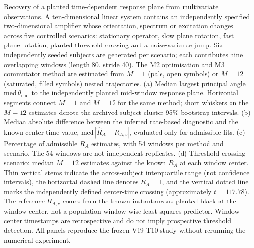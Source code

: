 \caption{Recovery of a planted time-dependent response plane from multivariate observations. A ten-dimensional linear system contains an independently specified two-dimensional amplifier whose orientation, spectrum or excitation changes across five controlled scenarios: stationary operator, slow plane rotation, fast plane rotation, planted threshold crossing and a noise-variance jump. Six independently seeded subjects are generated per scenario; each contributes nine overlapping windows (length 80, stride 40). The M2 optimisation and M3 commutator method are estimated from $M=1$ (pale, open symbols) or $M=12$ (saturated, filled symbols) nested trajectories. (a) Median largest principal angle $\mathrm{med}\,\theta_{\mathrm{mid}}$ to the independently planted mid-window response plane. Horizontal segments connect $M=1$ and $M=12$ for the same method; short whiskers on the $M=12$ estimates denote the archived subject-cluster 95\% bootstrap intervals. (b) Median absolute difference between the inferred rate-based diagnostic and the known center-time value, $\mathrm{med}\,|\widehat R_A-R_{A,c}|$, evaluated only for admissible fits. (c) Percentage of admissible $R_A$ estimates, with 54 windows per method and scenario. The 54 windows are not independent replicates. (d) Threshold-crossing scenario: median $M=12$ estimates against the known $R_A$ at each window center. Thin vertical stems indicate the across-subject interquartile range (not confidence intervals), the horizontal dashed line denotes $R_A=1$, and the vertical dotted line marks the independently defined center-time crossing (approximately $t=117.78$). The reference $R_{A,c}$ comes from the known instantaneous planted block at the window center, not a population window-wise least-squares predictor. Window-center timestamps are retrospective and do not imply prospective threshold detection. All panels reproduce the frozen V19 T10 study without rerunning the numerical experiment.}
